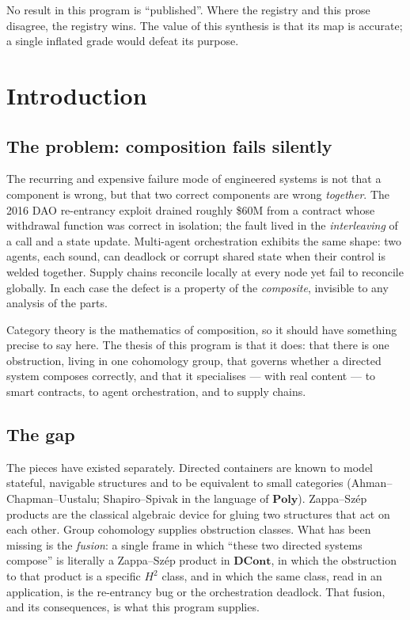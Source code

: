 \documentclass[11pt]{article}
\theoremstyle{plain}
\theoremstyle{definition}
\theoremstyle{remark}
\newcommand{\DCont}{\mathbf{DCont}}
\newcommand{\Poly}{\mathbf{Poly}}
\newcommand{\HH}[1]{H^{#1}}
\begin{document}
\noindent No result in this program is ``published''. Where the registry and this prose
disagree, the registry wins. The value of this synthesis is that its map is accurate; a
single inflated grade would defeat its purpose.

\section{Introduction}\label{sec:intro}

\subsection{The problem: composition fails silently}

The recurring and expensive failure mode of engineered systems is not that a component
is wrong, but that two correct components are wrong \emph{together}. The 2016 DAO
re-entrancy exploit drained roughly \$60M from a contract whose withdrawal function was
correct in isolation; the fault lived in the \emph{interleaving} of a call and a state
update. Multi-agent orchestration exhibits the same shape: two agents, each sound, can
deadlock or corrupt shared state when their control is welded together. Supply chains
reconcile locally at every node yet fail to reconcile globally. In each case the defect
is a property of the \emph{composite}, invisible to any analysis of the parts.

Category theory is the mathematics of composition, so it should have something precise to
say here. The thesis of this program is that it does: that there is one obstruction, living
in one cohomology group, that governs whether a directed system composes correctly, and
that it specialises --- with real content --- to smart contracts, to agent orchestration,
and to supply chains.

\subsection{The gap}

The pieces have existed separately. Directed containers are known to model stateful,
navigable structures and to be equivalent to small categories (Ahman--Chapman--Uustalu;
Shapiro--Spivak in the language of $\Poly$). Zappa--Sz\'ep products are the classical
algebraic device for gluing two structures that act on each other. Group cohomology
supplies obstruction classes. What has been missing is the \emph{fusion}: a single frame
in which ``these two directed systems compose'' is literally a Zappa--Sz\'ep product in
$\DCont$, in which the obstruction to that product is a specific $\HH{2}$ class, and in
which the same class, read in an application, is the re-entrancy bug or the orchestration
deadlock. That fusion, and its consequences, is what this program supplies.
\end{document}
